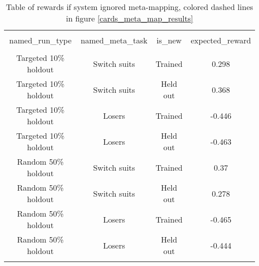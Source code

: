 \begin{table}[H]
\scriptsize
\centering
\begin{tabular}{@{\extracolsep{5pt}} cccc}
\\[-1.8ex]\hline
\hline \\[-1.8ex]
named\_run\_type & named\_meta\_task & is\_new & expected\_reward \\
\hline \\[-1.8ex]
Targeted 10\% holdout & Switch suits & Trained & 0.298 \\
Targeted 10\% holdout & Switch suits & Held out & 0.368 \\
Targeted 10\% holdout & Losers & Trained & -0.446 \\
Targeted 10\% holdout & Losers & Held out & -0.463 \\
Random 50\% holdout & Switch suits & Trained & 0.37 \\
Random 50\% holdout & Switch suits & Held out & 0.278 \\
Random 50\% holdout & Losers & Trained & -0.465 \\
Random 50\% holdout & Losers & Held out & -0.444 \\
\hline \\[-1.8ex]
\end{tabular}
\caption{Table of rewards if system ignored meta-mapping, colored dashed lines in figure \ref{cards_meta_map_results}}
\end{table}

